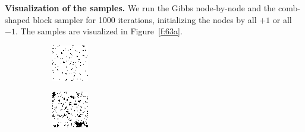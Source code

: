 \documentclass{article}
\begin{document}
\noindent
\textbf{Visualization of the samples.}
\noindent
We run the Gibbs node-by-node and the comb-shaped block sampler for 1000 iterations, initializing the nodes by
all $+1$ or all $-1$. The samples are visualized in Figure~\ref{f:63a}.
%
\begin{figure}[h]
\captionsetup[subfigure]{labelformat=empty}
\centering
%
\begin{subfigure}[t]{0.09\textwidth}
\centering
\includegraphics[width=\textwidth]{./computational/results/gibbs_node_sampler_positive_iter_0.png}
\vspace{-0.6cm}
\end{subfigure}\hspace{0.001\textwidth}
%
%
\begin{subfigure}[t]{0.09\textwidth}
\centering
\includegraphics[width=\textwidth]{./computational/results/gibbs_node_sampler_positive_iter_100.png}

\end{subfigure}
\end{figure}
\end{document}
